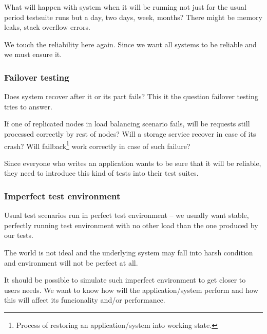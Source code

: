 \documentclass[
  master,
  biblatex,
  glossaries,
  index
]{kidiplom}
\begin{document}
What will happen with system when it will be running not just for the usual period testsuite runs but a day, two days, week, months? There might be memory leaks, stack overflow errors.

We touch the reliability here again. Since we want all systems to be reliable and we must ensure it.



\subsubsection{Failover testing}

Does system recover after it or its part fails? This it the question failover testing tries to answer.

If one of replicated nodes in load balancing scenario fails, will be requests still processed correctly by rest of nodes? Will a storage service recover in case of its crash? Will failback\footnote{Process of restoring an application/system into working state.} work correctly in case of such failure?

Since everyone who writes an application wants to be sure that it will be reliable, they need to introduce this kind of tests into their test suites.


\subsubsection{Imperfect test environment}

Usual test scenarios run in perfect test environment -- we usually want stable, perfectly running test environment with no other load than the one produced by our tests.

The world is not ideal and the underlying system may fall into harsh condition and environment will not be perfect at all.

It should be possible to simulate such imperfect environment to get closer to users needs. We want to know how will the application/system perform and how this will affect its funcionality and/or performance.

\end{document}
